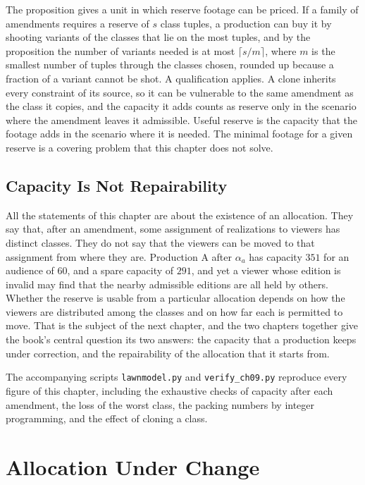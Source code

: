 \documentclass[11pt,twoside,openright]{book}
\theoremstyle{plain}
\theoremstyle{definition}
\theoremstyle{remark}
\begin{document}
The proposition gives a unit in which reserve footage can be priced. If a family of amendments requires a reserve of $s$ class tuples, a production can buy it by shooting variants of the classes that lie on the most tuples, and by the proposition the number of variants needed is at most $\lceil s/m\rceil$, where $m$ is the smallest number of tuples through the classes chosen, rounded up because a fraction of a variant cannot be shot. A qualification applies. A clone inherits every constraint of its source, so it can be vulnerable to the same amendment as the class it copies, and the capacity it adds counts as reserve only in the scenario where the amendment leaves it admissible. Useful reserve is the capacity that the footage adds in the scenario where it is needed. The minimal footage for a given reserve is a covering problem that this chapter does not solve.

\section{Capacity Is Not Repairability}\label{sec:notrepair}

All the statements of this chapter are about the existence of an allocation. They say that, after an amendment, some assignment of realizations to viewers has distinct classes. They do not say that the viewers can be moved to that assignment from where they are. Production A after $\alpha_a$ has capacity $351$ for an audience of $60$, and a spare capacity of $291$, and yet a viewer whose edition is invalid may find that the nearby admissible editions are all held by others. Whether the reserve is usable from a particular allocation depends on how the viewers are distributed among the classes and on how far each is permitted to move. That is the subject of the next chapter, and the two chapters together give the book's central question its two answers: the capacity that a production keeps under correction, and the repairability of the allocation that it starts from.

The accompanying scripts \texttt{lawnmodel.py} and \texttt{verify\_ch09.py} reproduce every figure of this chapter, including the exhaustive checks of capacity after each amendment, the loss of the worst class, the packing numbers by integer programming, and the effect of cloning a class.

\chapter{Allocation Under Change}
\label{ch:repair}
\end{document}
